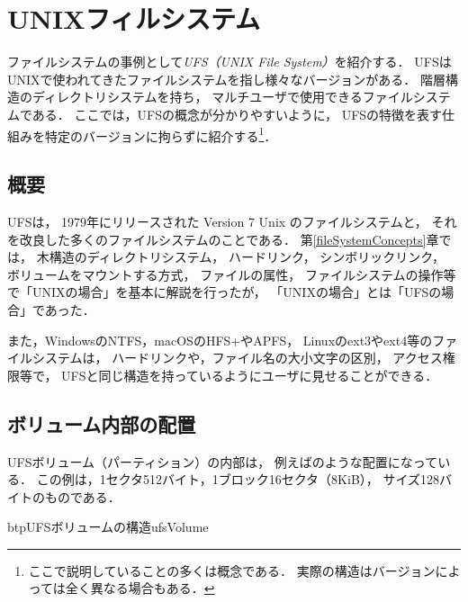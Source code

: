 \chapter{UNIXフィルシステム}
ファイルシステムの事例として\emph{UFS（UNIX File System）}を紹介する．
UFSはUNIXで使われてきたファイルシステムを指し様々なバージョンがある．
階層構造のディレクトリシステムを持ち，
マルチユーザで使用できるファイルシステムである．
ここでは，UFSの概念が分かりやすいように，
UFSの特徴を表す仕組みを特定のバージョンに拘らずに紹介する\footnote{
ここで説明していることの多くは概念である．
実際の構造はバージョンによっては全く異なる場合もある．}．

\section{概要}
UFSは，
1979年にリリースされた Version 7 Unix のファイルシステムと，
それを改良した多くのファイルシステムのことである．
第\ref{fileSystemConcepts}章では，
木構造のディレクトリシステム，
ハードリンク，
シンボリックリンク，
ボリュームをマウントする方式，
ファイルの属性，
ファイルシステムの操作等で「UNIXの場合」を基本に解説を行ったが，
「UNIXの場合」とは「UFSの場合」であった．

また，WindowsのNTFS，macOSのHFS+やAPFS，
Linuxのext3やext4等のファイルシステムは，
ハードリンクや，ファイル名の大小文字の区別，
アクセス権限等で，
UFSと同じ構造を持っているようにユーザに見せることができる．

\section{ボリューム内部の配置}
\label{ufsVolumeLayout}
UFSボリューム（パーティション）の内部は，
例えばのような配置になっている．
この例は，1セクタ512バイト，1ブロック16セクタ（8KiB），
\inode サイズ128バイトのものである．

\begin{myfig}{btp}{UFSボリュームの構造}{ufsVolume}
\end{myfig}

